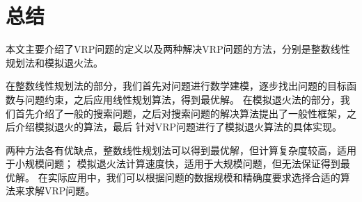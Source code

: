 \section{总结}
本文主要介绍了VRP问题的定义以及两种解决VRP问题的方法，分别是整数线性规划法和模拟退火法。

在整数线性规划法的部分，我们首先对问题进行数学建模，逐步找出问题的目标函数与问题约束，之后应用线性规划算法，得到最优解。
在模拟退火法的部分，我们首先介绍了一般的搜索问题，之后对搜索问题的解决算法提出了一般性框架，之后介绍模拟退火的算法，最后
针对VRP问题进行了模拟退火算法的具体实现。

两种方法各有优缺点，整数线性规划法可以得到最优解，但计算复杂度较高，适用于小规模问题；
模拟退火法计算速度快，适用于大规模问题，但无法保证得到最优解。
在实际应用中，我们可以根据问题的数据规模和精确度要求选择合适的算法来求解VRP问题。